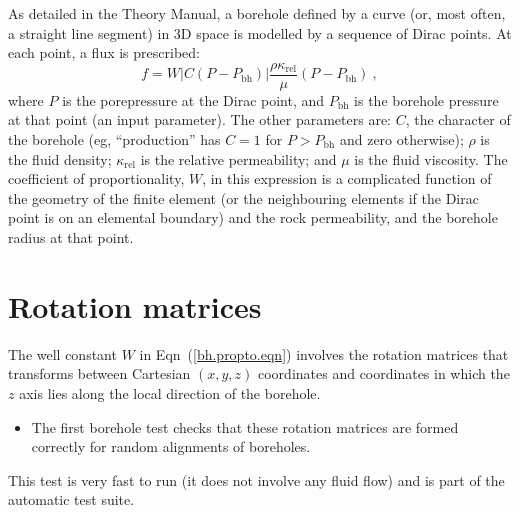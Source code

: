\documentclass[]{scrreprt}
\begin{document}
As detailed in the Theory Manual, a borehole defined by a curve (or,
most often, a straight line segment) in 3D space is modelled by a
sequence of Dirac points.  At each point, a flux is prescribed:
\begin{equation}
f = W|C(P-P_{\mathrm{bh}})| \frac{\rho \kappa_{\mathrm{rel}}}{\mu} (P - P_{\mathrm{bh}}) \ ,
\label{bh.propto.eqn}
\end{equation}
where $P$ is the porepressure at the Dirac point, and
$P_{\mathrm{bh}}$ is the borehole pressure at that point (an input
parameter).  The other parameters are: $C$, the character of the
borehole (eg, ``production'' has $C=1$ for $P>P_{\mathrm{bh}}$ and zero
otherwise); $\rho$ is the fluid density; $\kappa_{\mathrm{rel}}$ is
the relative permeability; and $\mu$ is the fluid viscosity.   The
coefficient of proportionality, $W$, in this expression is a
complicated function of the geometry of the finite element (or the
neighbouring elements if the Dirac point is on an elemental boundary)
and the rock permeability, and the borehole radius at that point.

\section{Rotation matrices}
The well constant $W$ in Eqn~(\ref{bh.propto.eqn})
involves the rotation matrices that transforms between Cartesian
$(x,y,z)$ coordinates and coordinates in which the $z$ axis lies along
the local direction of the borehole.
\begin{itemize}
\item The first borehole test checks that these rotation matrices are
  formed correctly for random alignments of boreholes.
\end{itemize}
This test is very fast to run (it does not involve any fluid flow) and
is part of the automatic test suite.
\end{document}
